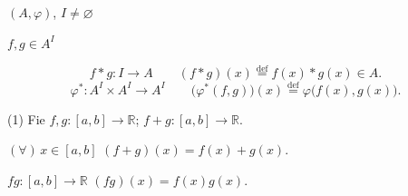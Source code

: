 \documentclass[12pt]{article}
\begin{document}
\medskip
\noindent $(A,\varphi)$, $I\neq\varnothing$

\noindent $f,g\in A^I$

\[
f*g : I\to A \qquad (f*g)(x) \overset{\text{def}}{=} f(x)*g(x) \in A.
\]
\[
\varphi^* : A^I\times A^I \to A^I \qquad \big(\varphi^*(f,g)\big)(x) \overset{\text{def}}{=} \varphi\big(f(x),g(x)\big).
\]

\medskip
\noindent (1) Fie $f,g : [a,b]\to\mathbb{R}$; \quad $f+g : [a,b]\to\mathbb{R}$.

\noindent $(\forall)\, x\in[a,b]$ \qquad $(f+g)(x) = f(x)+g(x)$.

\noindent $fg : [a,b]\to\mathbb{R}$ \qquad $(fg)(x) = f(x)g(x)$.
\end{document}
